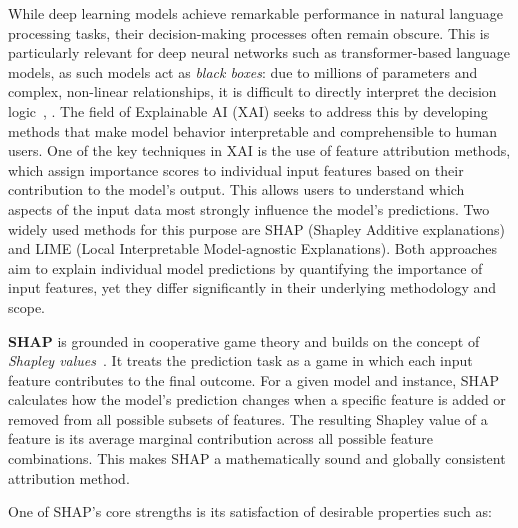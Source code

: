 While deep learning models achieve remarkable performance in natural language processing tasks, their decision-making processes often remain obscure. This is particularly relevant for deep neural networks such as transformer-based language models, as such models act as \emph{black boxes}: due to millions of parameters and complex, non-linear relationships, it is difficult to directly interpret the decision logic~\cite{bilal2025}, \cite{ali2022}. The field of Explainable AI (XAI) seeks to address this by developing methods that make model behavior interpretable and comprehensible to human users. %
One of the key techniques in XAI is the use of feature attribution methods, which assign importance scores to individual input features based on their contribution to the model's output. This allows users to understand which aspects of the input data most strongly influence the model's predictions. Two widely used methods for this purpose are SHAP (Shapley Additive explanations) and LIME (Local Interpretable Model-agnostic Explanations). Both approaches aim to explain individual model predictions by quantifying the importance of input features, yet they differ significantly in their underlying methodology and scope.

\textbf{SHAP} is grounded in cooperative game theory and builds on the concept of \emph{Shapley values}~\cite{lundberg2017shap}. It treats the prediction task as a game in which each input feature contributes to the final outcome. For a given model and instance, SHAP calculates how the model's prediction changes when a specific feature is added or removed from all possible subsets of features. The resulting Shapley value of a feature is its average marginal contribution across all possible feature combinations. This makes SHAP a mathematically sound and globally consistent attribution method.

One of SHAP's core strengths is its satisfaction of desirable properties such as:

